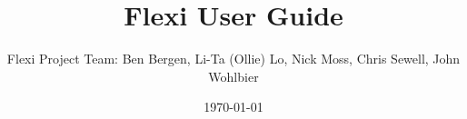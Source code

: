 
\title{Flexi User Guide}
\date{\today}
\author{Flexi Project Team: Ben Bergen, Li-Ta (Ollie) Lo, Nick Moss, Chris Sewell, John Wohlbier}

